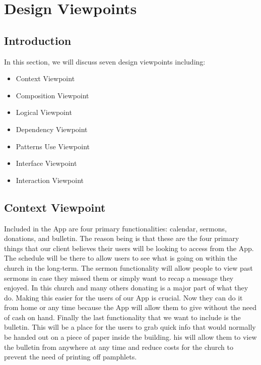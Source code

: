 \documentclass[letterpaper,10pt,draftclsnofoot,onecolumn,titlepage]{IEEEtran}
\begin{document}
	\section{Design Viewpoints}

		\subsection{Introduction}
		In this section, we will discuss seven design viewpoints including:
			\begin{itemize}
				\item{Context Viewpoint}
				\item{Composition Viewpoint}
				\item{Logical Viewpoint}
				\item{Dependency Viewpoint}
				\item{Patterns Use Viewpoint}
				\item{Interface Viewpoint}
				\item{Interaction Viewpoint}
			\end{itemize}

		\subsection{Context Viewpoint}
		Included in the \gls{App} are four primary functionalities: calendar, sermons, donations, and bulletin.
		The reason being is that these are the four primary things that our client believes their users will be looking to access from the \gls{App}.
		The schedule will be there to allow users to see what is going on within the church in the long-term.
		The sermon functionality will allow people to view past sermons in case they missed them or simply want to recap a message they enjoyed.
		In this church and many others donating is a major part of what they do.
		Making this easier for the users of our \gls{App} is crucial.
		Now they can do it from home or any time because the \gls{App} will allow them to give without the need of cash on hand.
		Finally the last functionality that we want to include is the bulletin.
		This will be a place for the users to grab quick info that would normally be handed out on a piece of paper inside the building.
		his will allow them to view the bulletin from anywhere at any time and reduce costs for the church to prevent the need of printing off pamphlets.
\end{document}
